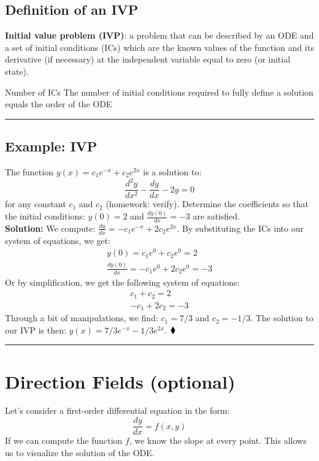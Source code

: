 \subsection{Definition of an IVP}
\textbf{Initial value problem (IVP)}:  a problem that can be described by an ODE and a set of initial conditions (ICs) which are the known values of the function and its derivative (if necessary) at the independent variable equal to zero (or initial state).

\begin{testv}{Number of ICs}{}
The number of initial conditions required to fully define a solution equals the order of the ODE
\end{testv}

\begin{center}
\noindent\rule{4cm}{0.4pt}
\end{center}

\subsection{Example: IVP}
\begin{exmp}
The function $y(x)=c_1 e^{-x}+c_2e^{2x}$ is a solution to:
\begin{equation}
\frac{d^2 y}{dx^2}-\frac{dy}{dx}-2y=0
\end{equation}
for any constant $c_1$ and $c_2$ (homework: verify). Determine the coefficients so that the initial conditions:  $y(0)=2$ and $\frac{dy(0)}{dx}=-3$ are satisfied.\\
\textbf{Solution:}  We compute: $\frac{d y}{dx}=-c_1e^{-x}+2c_2e^{2x}$. By substituting the ICs into our system of equations, we get:
\begin{eqnarray}
y(0)=c_1e^0+c_2e^0=2\\
\frac{dy(0)}{dx}=-c_1e^0+2c_2e^0=-3
\end{eqnarray}
Or by simplification, we get the following system of equations:
\begin{eqnarray}
c_1+c_2=2\\
-c_1+2c_2=-3
\end{eqnarray}
Through a bit of manipulations, we find: $c_1=7/3$ and $c_2=-1/3$. The solution to our IVP is then: $y(x)=7/3 e^{-x}-1/3e^{2x}$. $\mathbin{\blacklozenge}$
\end{exmp}
\begin{center}
\noindent\rule{4cm}{0.4pt}
\end{center}


\section{Direction Fields (optional)}
Let's consider a first-order differential equation in the form:
\begin{equation}
\frac{dy}{dx}=f(x,y)
\end{equation}
 If we can compute the function $f$, we know the slope at every point. This allows us to visualize the solution of the ODE.

